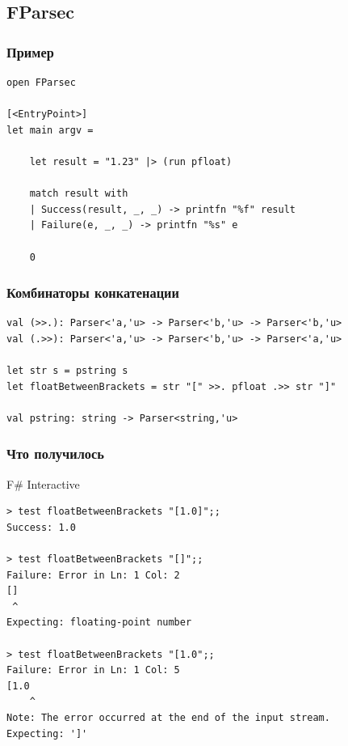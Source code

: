 \documentclass[xetex,mathserif,serif]{beamer}
\begin{document}
	\subsection{FParsec}

	\begin{frame}[fragile]
		\frametitle{Пример}
		\begin{verbatim}
open FParsec

[<EntryPoint>]
let main argv =

    let result = "1.23" |> (run pfloat)

    match result with
    | Success(result, _, _) -> printfn "%f" result
    | Failure(e, _, _) -> printfn "%s" e

    0
		\end{verbatim}
	\end{frame}

	\begin{frame}[fragile]
		\frametitle{Комбинаторы конкатенации}
		\begin{verbatim}
val (>>.): Parser<'a,'u> -> Parser<'b,'u> -> Parser<'b,'u>
val (.>>): Parser<'a,'u> -> Parser<'b,'u> -> Parser<'a,'u>

let str s = pstring s
let floatBetweenBrackets = str "[" >>. pfloat .>> str "]"

val pstring: string -> Parser<string,'u>
		\end{verbatim}
	\end{frame}

	\begin{frame}[fragile]
		\frametitle{Что получилось}
		\begin{small}
			\begin{alertblock}{F\# Interactive}
				\begin{verbatim}
> test floatBetweenBrackets "[1.0]";;
Success: 1.0

> test floatBetweenBrackets "[]";;
Failure: Error in Ln: 1 Col: 2
[]
 ^
Expecting: floating-point number

> test floatBetweenBrackets "[1.0";;
Failure: Error in Ln: 1 Col: 5
[1.0
    ^
Note: The error occurred at the end of the input stream.
Expecting: ']'
				\end{verbatim}
			\end{alertblock}
		\end{small}
	\end{frame}
\end{document}
